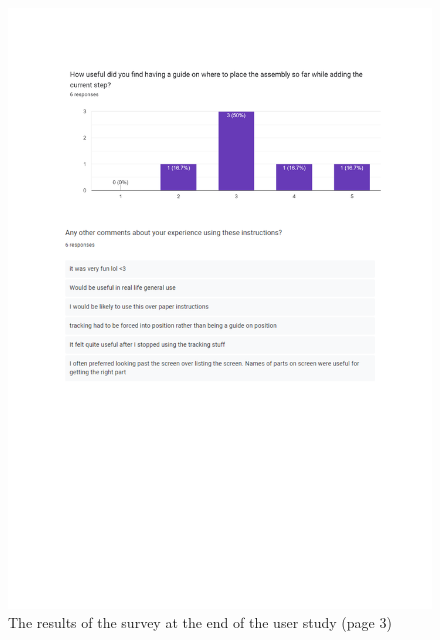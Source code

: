 \documentclass{l4proj}
\begin{document}
\begin{appendices}
\begin{figure}
    \centering
    \includegraphics[width=1\linewidth]{dissertation//images/2ndQuestionnaireResults3.pdf}
    \caption{The results of the survey at the end of the user study (page 3)}
\end{figure}


\end{appendices}
\end{document}
